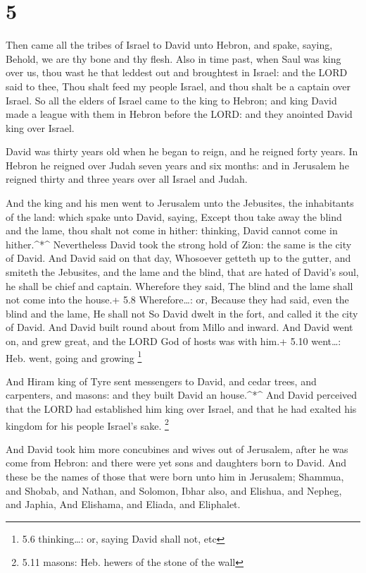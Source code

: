 \hypertarget{section-4}{%
\section{5}\label{section-4}}

 Then came all the tribes of Israel to David unto Hebron,
and spake, saying, Behold, we are thy bone and thy flesh. 
Also in time past, when Saul was king over us, thou wast he that leddest
out and broughtest in Israel: and the LORD said to thee, Thou shalt feed
my people Israel, and thou shalt be a captain over Israel. 
So all the elders of Israel came to the king to Hebron; and king David
made a league with them in Hebron before the LORD: and they anointed
David king over Israel.

 David was thirty years old when he began to reign, and he
reigned forty years.  In Hebron he reigned over Judah seven
years and six months: and in Jerusalem he reigned thirty and three years
over all Israel and Judah.

 And the king and his men went to Jerusalem unto the
Jebusites, the inhabitants of the land: which spake unto David, saying,
Except thou take away the blind and the lame, thou shalt not come in
hither: thinking, David cannot come in hither.\^{}*\^{} 
Nevertheless David took the strong hold of Zion: the same is the city of
David.  And David said on that day, Whosoever getteth up to
the gutter, and smiteth the Jebusites, and the lame and the blind, that
are hated of David's soul, he shall be chief and captain. Wherefore they
said, The blind and the lame shall not come into the house.+ 5.8
Wherefore\ldots: or, Because they had said, even the blind and the lame,
He shall not  So David dwelt in the fort, and called it the
city of David. And David built round about from Millo and inward.
 And David went on, and grew great, and the LORD God of
hosts was with him.+ 5.10 went\ldots: Heb. went, going and growing
\footnote{5.6 thinking\ldots: or, saying David shall not, etc}

 And Hiram king of Tyre sent messengers to David, and cedar
trees, and carpenters, and masons: and they built David an
house.\^{}*\^{}  And David perceived that the LORD had
established him king over Israel, and that he had exalted his kingdom
for his people Israel's sake. \footnote{5.11 masons: Heb. hewers of the
  stone of the wall}

 And David took him more concubines and wives out of
Jerusalem, after he was come from Hebron: and there were yet sons and
daughters born to David.  And these be the names of those
that were born unto him in Jerusalem; Shammua, and Shobab, and Nathan,
and Solomon,  Ibhar also, and Elishua, and Nepheg, and
Japhia,  And Elishama, and Eliada, and Eliphalet.

